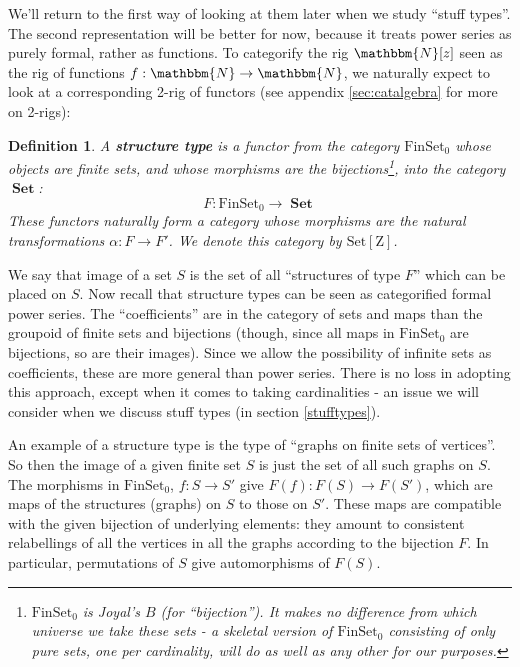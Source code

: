 \documentclass{amsart} \usepackage{amsmath,amssymb,bbm}
\newcommand{\opname}[1]{\operatorname{#1}}
\newtheorem{definition}{Definition}
\newcommand{\catname}[1]{\boldsymbol{\opname{{#1}}}}
\newcommand{\FSN}{\catname{FinSet_0}}
\newcommand{\Set}{\catname{Set}}
\newcommand{\SetZ}{\catname{Set [ Z ]}}
\begin{document}
We'll return to the first way of looking at them later when we study
``stuff types''.  The second representation will be better for now,
because it treats power series as purely formal, rather as functions.
To categorify the rig $\mathbbm{N} [ z ]$ seen as the rig of functions
$f : \mathbbm{N} \rightarrow \mathbbm{N}$, we naturally expect to look
at a corresponding 2-rig of functors (see appendix
\ref{sec:catalgebra} for more on 2-rigs):

\begin{definition}
  A {\textbf{structure type}} is a functor from the category
  $\FSN$ whose objects are finite sets, and whose
  morphisms are the bijections{\footnote{$\FSN$ is
  Joyal's {\textbf{$B$}} (for ``bijection'').  It makes no difference from
  which universe we take these sets - a skeletal version of
  $\FSN$ consisting of only pure sets, one per
  cardinality, will do as well as any other for our purposes.}}, into the
  category $\Set$:
  \[ F : \FSN \rightarrow \Set \]
  These functors naturally form a category whose morphisms are the natural
  transformations $\alpha : F \rightarrow F'$.  We denote this category by
  $\SetZ$.
\end{definition}

We say that image of a set $S$ is the set of all ``structures of type
$F$'' which can be placed on $S$.  Now recall that structure types can
be seen as categorified formal power series.  The ``coefficients'' are
in the category of sets and maps than the groupoid of finite sets and
bijections (though, since all maps in $\FSN$ are bijections, so are
their images).  Since we allow the possibility of infinite sets as
coefficients, these are more general than power series.  There is no
loss in adopting this approach, except when it comes to taking
cardinalities - an issue we will consider when we discuss stuff types
(in section \ref{stufftypes}).

An example of a structure type is the type of ``graphs on finite sets
of vertices''.  So then the image of a given finite set $S$ is just
the set of all such graphs on $S$.  The morphisms in $\FSN$, $f : S
\rightarrow S'$ give $F ( f ) : F ( S ) \rightarrow F ( S' )$, which
are maps of the structures (graphs) on $S$ to those on $S'$.  These
maps are compatible with the given bijection of underlying elements:
they amount to consistent relabellings of all the vertices in all the
graphs according to the bijection $F$.  In particular, permutations of
$S$ give automorphisms of $F(S)$.
\end{document}
